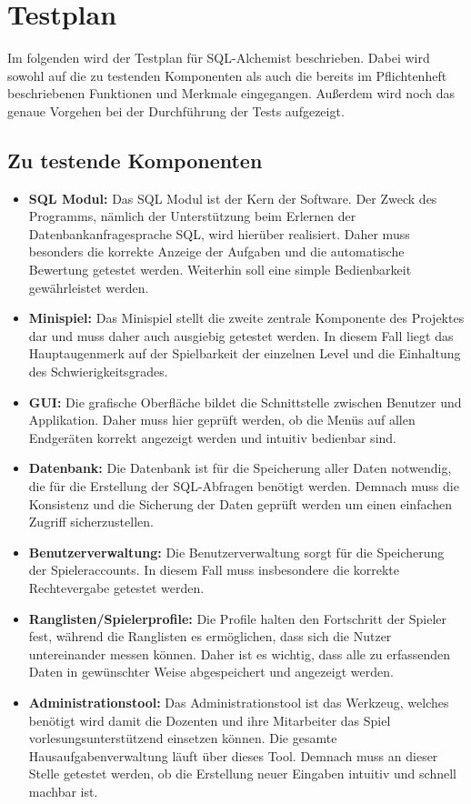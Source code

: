 
\chapter{Testplan}

Im folgenden wird der Testplan für SQL-Alchemist beschrieben. Dabei wird sowohl auf die zu testenden Komponenten als auch die bereits im Pflichtenheft beschriebenen Funktionen und Merkmale eingegangen. Außerdem wird noch das genaue Vorgehen bei der Durchführung der Tests aufgezeigt.

\section{Zu testende Komponenten}

\begin{itemize}
\item \textbf{SQL Modul: }Das SQL Modul ist der Kern der Software. Der Zweck des Programms, nämlich der Unterstützung beim Erlernen der Datenbankanfragesprache SQL, wird hierüber realisiert. Daher muss besonders die korrekte Anzeige der Aufgaben und die automatische Bewertung getestet werden. Weiterhin soll eine simple Bedienbarkeit gewährleistet werden.
\item \textbf{Minispiel: }Das Minispiel stellt die zweite zentrale Komponente des Projektes dar und muss daher auch ausgiebig getestet werden. In diesem Fall liegt das Hauptaugenmerk auf der Spielbarkeit der einzelnen Level und die Einhaltung des Schwierigkeitsgrades.
\item \textbf{GUI: }Die grafische Oberfläche bildet die Schnittstelle zwischen Benutzer und Applikation. Daher muss hier geprüft werden, ob die Menüs auf allen Endgeräten korrekt angezeigt werden und intuitiv bedienbar sind.
\item \textbf{Datenbank: }Die Datenbank ist für die Speicherung aller Daten notwendig, die für die Erstellung der SQL-Abfragen benötigt werden. Demnach muss die Konsistenz und die Sicherung der Daten geprüft werden um einen einfachen Zugriff sicherzustellen.
\item \textbf{Benutzerverwaltung: }Die Benutzerverwaltung sorgt für die Speicherung der Spieleraccounts. In diesem Fall muss insbesondere die korrekte Rechtevergabe getestet werden.
\item \textbf{Ranglisten/Spielerprofile: }Die Profile halten den Fortschritt der Spieler fest, während die Ranglisten es ermöglichen, dass sich die Nutzer untereinander messen können. Daher ist es wichtig, dass alle zu erfassenden Daten in gewünschter Weise abgespeichert und angezeigt werden.
\item \textbf{Administrationstool: }Das Administrationstool ist das Werkzeug, welches benötigt wird damit die Dozenten und ihre Mitarbeiter das Spiel vorlesungsunterstützend einsetzen können. Die gesamte Hausaufgabenverwaltung läuft über dieses Tool. Demnach muss an dieser Stelle getestet werden, ob die Erstellung neuer Eingaben intuitiv und schnell machbar ist.
\end{itemize}

